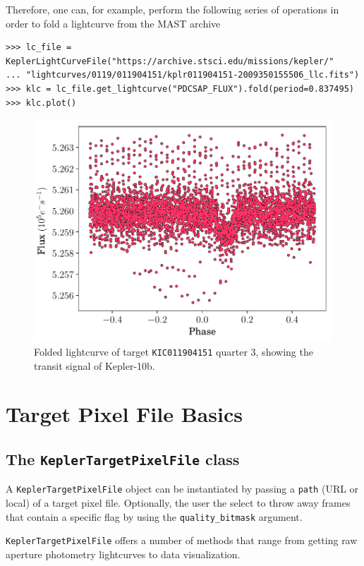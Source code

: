 \documentclass{article}
\begin{document}
        Therefore, one can, for example, perform the following series of operations
        in order to fold a lightcurve from the MAST archive
\begin{verbatim}
>>> lc_file = KeplerLightCurveFile("https://archive.stsci.edu/missions/kepler/"
... "lightcurves/0119/011904151/kplr011904151-2009350155506_llc.fits")
>>> klc = lc_file.get_lightcurve("PDCSAP_FLUX").fold(period=0.837495)
>>> klc.plot()
\end{verbatim}
        \begin{figure}[!htb]
            \centering
            \includegraphics[scale=.5]{figs/fold-lc.pdf}
            \caption{Folded lightcurve of target \texttt{KIC011904151} quarter 3, showing the
            transit signal of Kepler-10b.}
            \label{fig:fold-method}
        \end{figure}

\section{Target Pixel File Basics}
    \subsection{The \texttt{KeplerTargetPixelFile} class}
        A \texttt{KeplerTargetPixelFile} object can be instantiated
        by passing a \texttt{path} (URL or local) of a target pixel file.
        Optionally, the user the select to throw away frames that contain
        a specific flag by using the \texttt{quality\_bitmask} argument.

        \texttt{KeplerTargetPixelFile} offers a number of methods
        that range from getting raw aperture photometry lightcurves to
        data visualization.
\end{document}
